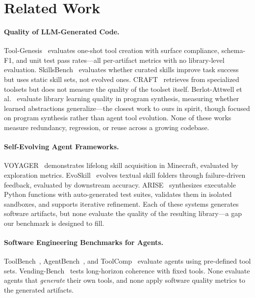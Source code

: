 \documentclass[10pt,twocolumn]{article}
\begin{document}
\section{Related Work}

\paragraph{Quality of LLM-Generated Code.} Tool-Genesis~\cite{xia2026toolgenesis} evaluates one-shot tool creation with surface compliance, schema-F1, and unit test pass rates---all per-artifact metrics with no library-level evaluation. SkillsBench~\cite{skillsbench2026} evaluates whether curated skills improve task success but uses static skill sets, not evolved ones. CRAFT~\cite{yuan2023craft} retrieves from specialized toolsets but does not measure the quality of the toolset itself. Berlot-Attwell et al.~\cite{berlotattwell2026} evaluate library learning quality in program synthesis, measuring whether learned abstractions generalize---the closest work to ours in spirit, though focused on program synthesis rather than agent tool evolution. None of these works measure redundancy, regression, or reuse across a growing codebase.

\paragraph{Self-Evolving Agent Frameworks.} VOYAGER~\cite{wang2023voyager} demonstrates lifelong skill acquisition in Minecraft, evaluated by exploration metrics. EvoSkill~\cite{alzubi2026evoskill} evolves textual skill folders through failure-driven feedback, evaluated by downstream accuracy. ARISE~\cite{kaliyev2026arise} synthesizes executable Python functions with auto-generated test suites, validates them in isolated sandboxes, and supports iterative refinement. Each of these systems generates software artifacts, but none evaluate the quality of the resulting library---a gap our benchmark is designed to fill.

\paragraph{Software Engineering Benchmarks for Agents.} ToolBench~\cite{qin2023toolbench}, AgentBench~\cite{liu2024agentbench}, and ToolComp~\cite{toolcomp2025} evaluate agents using pre-defined tool sets. Vending-Bench~\cite{backlund2025vendingbench} tests long-horizon coherence with fixed tools. None evaluate agents that \emph{generate} their own tools, and none apply software quality metrics to the generated artifacts.
\end{document}
